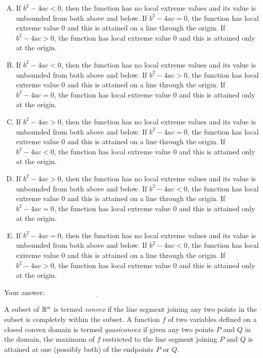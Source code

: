 \documentclass[10pt]{amsart}
\begin{document}
\begin{enumerate}
  \begin{enumerate}[(A)]
  \item If $b^2 - 4ac < 0$, then the function has no local extreme
    values and its value is unbounded from both above and below. If
    $b^2 - 4ac = 0$, the function has local extreme value $0$ and this
    is attained on a line through the origin. If $b^2 - 4ac > 0$, the
    function has local extreme value $0$ and this is attained only at
    the origin.
  \item If $b^2 - 4ac < 0$, then the function has no local extreme
    values and its value is unbounded from both above and below. If
    $b^2 - 4ac > 0$, the function has local extreme value $0$ and this
    is attained on a line through the origin. If $b^2 - 4ac = 0$, the
    function has local extreme value $0$ and this is attained only at
    the origin.
   \item If $b^2 - 4ac > 0$, then the function has no local extreme
    values and its value is unbounded from both above and below. If
    $b^2 - 4ac = 0$, the function has local extreme value $0$ and this
    is attained on a line through the origin. If $b^2 - 4ac < 0$, the
    function has local extreme value $0$ and this is attained only at
    the origin.
  \item If $b^2 - 4ac > 0$, then the function has no local extreme
    values and its value is unbounded from both above and below. If
    $b^2 - 4ac < 0$, the function has local extreme value $0$ and this
    is attained on a line through the origin. If $b^2 - 4ac = 0$, the
    function has local extreme value $0$ and this is attained only at
    the origin.
  \item If $b^2 - 4ac = 0$, then the function has no local extreme
    values and its value is unbounded from both above and below. If
    $b^2 - 4ac < 0$, the function has local extreme value $0$ and this
    is attained on a line through the origin. If $b^2 - 4ac > 0$, the
    function has local extreme value $0$ and this is attained only at
    the origin.
  \end{enumerate}

  \vspace{0.1in}
  Your answer: $\underline{\qquad\qquad\qquad\qquad\qquad\qquad\qquad}$
  \vspace{0.15in}

  A subset of $\mathbb{R}^n$ is termed {\em convex} if the line segment
  joining any two points in the subset is completely within the
  subset. A function $f$ of two variables defined on a closed convex
  domain is termed {\em quasiconvex} if given any two points $P$ and
  $Q$ in the domain, the maximum of $f$ restricted to the line segment
  joining $P$ and $Q$ is attained at one (possibly both) of the
  endpoints $P$ or $Q$.


\end{enumerate}
\end{document}
